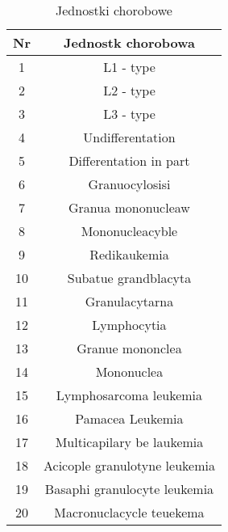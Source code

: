 	\begin{table}[h!]
		\centering
		\begin{tabular}{||c | c ||} 
			 \hline
			 Nr & Jednostk chorobowa \\ [0.5ex] 
			 \hline\hline
			 1 & L1 - type \\ 
			 2 & L2 - type \\
			 3 & L3 - type \\
			 4 & Undifferentation \\
			 5 & Differentation in part \\
			 6 & Granuocylosisi \\
			 7 & Granua mononucleaw \\
			 8 & Mononucleacyble \\
			 9 & Redikaukemia \\
			 10 & Subatue grandblacyta \\
			 11 & Granulacytarna \\
			 12 & Lymphocytia \\
			 13 & Granue mononclea \\
			 14 & Mononuclea \\
			 15 & Lymphosarcoma leukemia \\
			 16 & Pamacea Leukemia \\
			 17 & Multicapilary be laukemia \\
			 18 & Acicople granulotyne leukemia \\
			 19 & Basaphi granulocyte leukemia \\
			 20 & Macronuclacycle teuekema \\ [1ex] 
			 \hline
		\end{tabular}
		\caption{Jednostki chorobowe}
		\label{table:1}
	\end{table}